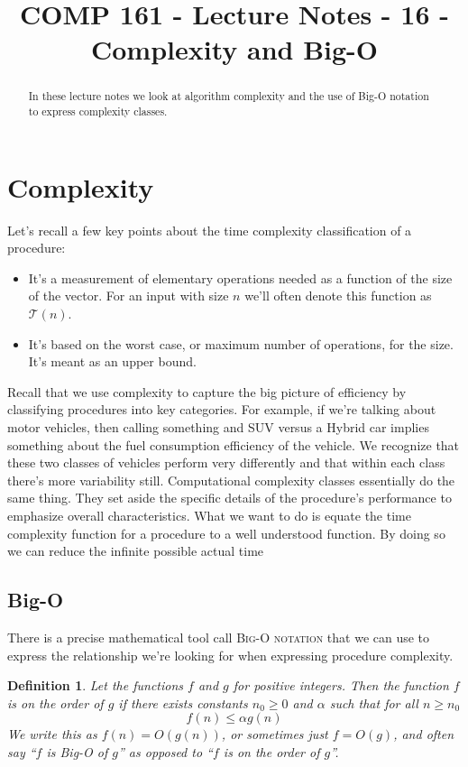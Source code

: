 \documentclass[]{tufte-handout}
\title{COMP 161 - Lecture Notes - 16 - Complexity and Big-O}
\date{}
\newtheorem{define}{Definition}
\begin{document}
 
\maketitle

\begin{abstract}
In these lecture notes we look at algorithm complexity and the use of Big-O notation to express complexity classes.
\end{abstract}

\section{Complexity}

Let's recall a few key points about the time complexity classification of a procedure:
\begin{itemize}
\item It's a measurement of elementary operations needed as a function of the size of the vector. For an input with size $n$ we'll often denote this function as $\mathcal{T}(n)$. 
\item It's based on the worst case, or maximum number of operations, for the size. It's meant as an upper bound. 
\end{itemize}

Recall that we use complexity to capture the big picture of efficiency by classifying procedures into key categories. For example, if we're talking about motor vehicles, then calling something and SUV versus a Hybrid car implies something about the fuel consumption efficiency of the vehicle. We recognize that these two classes of vehicles perform very differently and that within each class there's more variability still. Computational complexity classes essentially do the same thing. They set aside the specific details of the procedure's performance to emphasize overall characteristics. What we want to do is equate the time complexity function for a procedure to a well understood function. By doing so we can reduce the infinite possible actual time  

\subsection{ Big-O }

There is a precise mathematical tool call \textsc{Big-O notation} that we can use to express the relationship we're looking for when expressing procedure complexity. 
\begin{define}
Let the functions $f$ and $g$ for positive integers.  Then the function $f$ is \textit{on the order of} $g$ if there exists constants $n_0 \geq 0 $ and $\alpha$ such that for all $n 	\geq n_0$ 
\[
f(n) \leq \alpha g(n)
\]
We write this as $f(n) = O(g(n))$, or sometimes just $f = O(g)$, and often say ``$f$ is Big-O of $g$'' as opposed to ``$f$ is on the order of $g$''.
\label{def:bigO}
\end{define}
\end{document}
